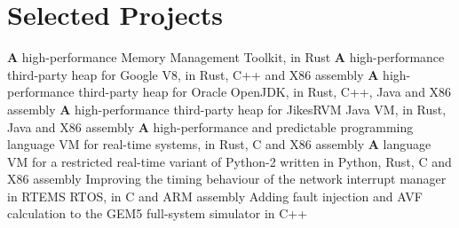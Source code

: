 \section{Selected Projects}

    {
        \textbf{A} high-performance Memory Management Toolkit, in Rust
    }
    {
        \textbf{A} high-performance third-party heap for Google V8, in Rust, C++ and X86 assembly
    }
    {
        \textbf{A} high-performance third-party heap for Oracle OpenJDK, in Rust, C++, Java and X86 assembly
    }
    {
        \textbf{A} high-performance third-party heap for JikesRVM Java VM, in Rust, Java and X86 assembly
    }
    {
        \textbf{A} high-performance and predictable programming language VM for real-time systems, in Rust, C and X86 assembly
    }
    {
        \textbf{A} language VM for a restricted real-time variant of Python-2 written in Python, Rust, C and X86 assembly
    }
    {Improving the timing behaviour of the network interrupt manager in RTEMS RTOS, in C and ARM assembly}
    {Adding fault injection and AVF calculation to the GEM5 full-system simulator in C++}
